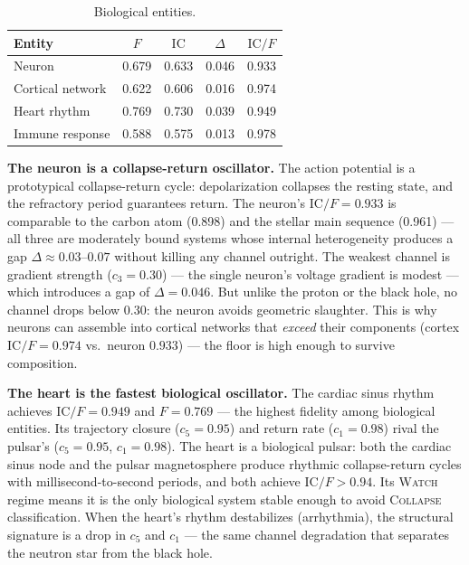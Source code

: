 \documentclass[
  aps,
  prd,
  twocolumn,
  superscriptaddress,
  nofootinbib,
  floatfix
]{revtex4-2}
\newcommand{\regime}[1]{\textsc{#1}}
\newcommand{\IC}{\mathrm{IC}}
\begin{document}
\begin{table}[t]
\caption{\label{tab:biological}Biological entities.}
\begin{ruledtabular}
\begin{tabular}{lcccc}
Entity & $F$ & $\IC$ & $\Delta$ & $\IC/F$ \\
\hline
Neuron            & 0.679 & 0.633 & 0.046 & 0.933 \\
Cortical network  & 0.622 & 0.606 & 0.016 & 0.974 \\
Heart rhythm      & 0.769 & 0.730 & 0.039 & 0.949 \\
Immune response   & 0.588 & 0.575 & 0.013 & 0.978 \\
\end{tabular}
\end{ruledtabular}
\end{table}

\textbf{The neuron is a collapse-return oscillator.}
The action potential is a prototypical collapse-return cycle:
depolarization collapses the resting state, and the refractory
period guarantees return.  The neuron's $\IC/F = 0.933$ is
comparable to the carbon atom (0.898) and the stellar main
sequence (0.961) --- all three are moderately bound systems
whose internal heterogeneity produces a gap
$\Delta \approx 0.03$--$0.07$ without killing any channel
outright.
The weakest channel is gradient strength ($c_3 = 0.30$)
--- the single neuron's voltage gradient is modest ---
which introduces a gap of $\Delta = 0.046$.  But unlike
the proton or the black hole, no channel drops below $0.30$:
the neuron avoids geometric slaughter.  This is why neurons
can assemble into cortical networks that \emph{exceed} their
components (cortex $\IC/F = 0.974$ vs.\ neuron $0.933$) ---
the floor is high enough to survive composition.

\textbf{The heart is the fastest biological oscillator.}
The cardiac sinus rhythm achieves $\IC/F = 0.949$ and
$F = 0.769$ --- the highest fidelity among biological
entities.  Its trajectory closure ($c_5 = 0.95$) and
return rate ($c_1 = 0.98$) rival the pulsar's ($c_5 = 0.95$,
$c_1 = 0.98$).  The heart is a biological pulsar: both
the cardiac sinus node and the pulsar magnetosphere produce
rhythmic collapse-return cycles with millisecond-to-second
periods, and both achieve $\IC/F > 0.94$.
Its \regime{Watch} regime means it is the only biological
system stable enough to avoid \regime{Collapse}
classification.  When the heart's rhythm destabilizes
(arrhythmia), the structural signature is a drop in $c_5$
and $c_1$ --- the same channel degradation that separates
the neutron star from the black hole.
\end{document}
